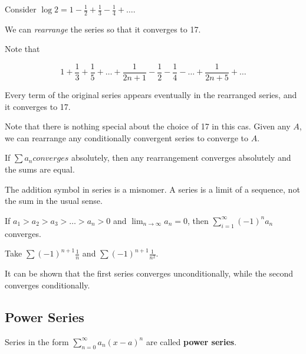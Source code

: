 \documentclass[11pt]{scrartcl}
\begin{document}
\begin{example}

Consider $\log 2 = 1-\frac{1}{2}+\frac{1}{3}-\frac{1}{4}+\dots$.

We can \textit{rearrange} the series so that it converges to 17.

Note that

\begin{equation*}
1+ \frac{1}{3}+\frac{1}{5}+\dots+\frac{1}{2n+1}-\frac{1}{2}-\frac{1}{4}-\dots+\frac{1}{2n+5}+\dots
\end{equation*}

Every term of the original series appears eventually in the rearranged series, and it converges to 17.

Note that there is nothing special about the choice of 17 in this
cas. Given any $A$, we can rearrange any conditionally convergent series to converge to $A$.

\end{example}

\begin{theorem}
  If $\sum a_n converges$ absolutely, then any rearrangement converges
  absolutely and the sums are equal.
\end{theorem}

\begin{remark}
  The addition symbol in series is a misnomer. A series is a limit of
  a sequence, not the sum in the usual sense.
\end{remark}

\begin{theorem}
If $a_1 > a_2 > a_3 > \dots > a_n > 0$ and $\lim_{n\to\infty}a_n = 0$, then $\sum_{i=1}^{\infty} (-1)^na_n$ converges.
\end{theorem}

\begin{example}

  Take $\sum (-1)^{n+1}\frac{1}{n}$  and $\sum (-1)^{n+1}\frac{1}{n^2}$.

  It can be shown that the first series converges unconditionally,
  while the second converges conditionally.

\end{example}

\subsection{Power Series}

Series in the form $\sum_{n=0}^{\infty}a_n(x-a)^n$ are called \textbf{power series}.
\end{document}
